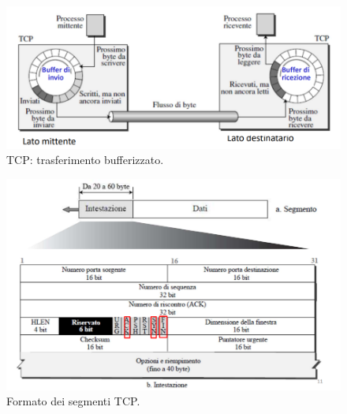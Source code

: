 \documentclass[11pt, italian, openany]{book}
\begin{document}
\begin{sloppypar}
\begin{figure}[!h]
	\centering
	\includegraphics[scale=0.3]{images/tcp-trasferimento-bufferizzato.png}
	\caption{TCP: trasferimento bufferizzato.}
	\label{fig:tcp-trasferimento}
\end{figure}
\begin{figure}[!h]
	\centering
	\includegraphics[scale=0.5]{images/tcp-formato-segmenti.png}
	\caption{Formato dei segmenti TCP.}
	\label{fig:tcp-segmento}
\end{figure}

\pagebreak


\end{sloppypar}
\end{document}
